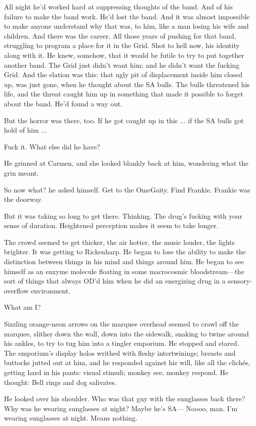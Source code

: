 All night he'd worked hard at suppressing thoughts of the band. And of his failure to make the band work. He'd lost the band. And it was almost impossible to make anyone understand why that was, to him, like a man losing his wife and children. And there was the career. All those years of pushing for that band, struggling to program a place for it in the Grid. Shot to hell now, his identity along with it. He knew, somehow, that it would be futile to try to put together another band. The Grid just didn't want him; and he didn't want the fucking Grid. And the elation was this: that ugly pit of displacement inside him closed up, was just gone, when he thought about the SA bulls. The bulls threatened his life, and the threat caught him up in something that made it possible to forget about the band. He'd found a way out.

But the horror was there, too. If he got caught up in this ... if the SA bulls got hold of him ...

Fuck it. What else did he have?

He grinned at Carmen, and she looked blankly back at him, wondering what the grin meant.

So now what? he asked himself. Get to the OmeGaity. Find Frankie. Frankie was the doorway.

But it was taking so long to get there. Thinking. The drug's fucking with your sense of duration. Heightened perception makes it seem to take longer.

The crowd seemed to get thicker, the air hotter, the music louder, the lights brighter. It was getting to Rickenharp. He began to lose the ability to make the distinction between things in his mind and things around him. He began to see himself as an enzyme molecule floating in some macrocosmic bloodstream—the sort of things that always OD'd him when he did an energizing drug in a sensory-overflow environment.

What am I?

Sizzling orange-neon arrows on the marquee overhead seemed to crawl off the marquee, slither down the wall, down into the sidewalk, snaking to twine around his ankles, to try to tug him into a tingler emporium. He stopped and stared. The emporium's display holos writhed with fleshy intertwinings; breasts and buttocks jutted out at him, and he responded against his will, like all the clichés, getting hard in his pants: visual stimuli; monkey see, monkey respond. He thought: Bell rings and dog salivates.

He looked over his shoulder. Who was that guy with the sunglasses back there? Why was he wearing sunglasses at night? Maybe he's SA— Noooo, man. I'm wearing sunglasses at night. Means nothing.

